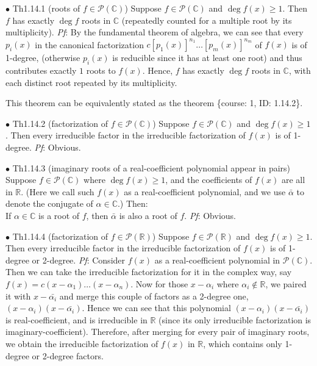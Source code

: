 \documentclass{article}
\begin{document}
\begin{Th}{$\bullet$ Th1.14.1 (roots of $f\in\mathcal{P}(\mathbb{C})$)}
    Suppose $f\in\mathcal{P}(\mathbb{C})$ and $\deg f(x)\geq 1$. Then $f$ has exactly $\deg f$ roots in $\mathbb{C}$ (repeatedly counted for a multiple root by its multiplicity).
    \tcblower
    \textit{Pf}: By the fundamental theorem of algebra, we can see that every $p_i(x)$ in the canonical factorization $c[p_1(x)]^{n_1}\dots[p_m(x)]^{n_m}$ of $f(x)$ is of 1-degree, (otherwise $p_i(x)$ is reducible since it has at least one root) and thus contributes exactly $1$ roots to $f(x)$. Hence, $f$ has exactly $\deg f$ roots in $\mathbb{C}$, with each distinct root repeated by its multiplicity. 
\end{Th}

\begin{Rmk}{}
    This theorem can be equivalently stated as the theorem \{course: 1, ID: 1.14.2\}.
\end{Rmk}

\begin{Th}{$\bullet$ Th1.14.2 (factorization of $f\in\mathcal{P}(\mathbb{C})$)}
    Suppose $f\in\mathcal{P}(\mathbb{C})$ and $\deg f(x)\geq 1$. Then every irreducible factor in the irreducible factorization of $f(x)$ is of 1-degree.
    \tcblower
    \textit{Pf}: Obvious.
\end{Th}

\begin{Th}{$\bullet$ Th1.14.3 (imaginary roots of a real-coefficient polynomial appear in pairs)}
    Suppose $f\in\mathcal{P}(\mathbb{C})$ where $\deg f(x)\geq 1$, and the coefficients of $f(x)$ are all in $\mathbb{R}$. \textcolor{Df}{(Here we call such $f(x)$ as a real-coefficient polynomial, and we use $\bar{\alpha}$ to denote the conjugate of $\alpha\in\mathbb{C}$.)} Then:\\
    If $\alpha\in\mathbb{C}$ is a root of $f$, then $\bar{\alpha}$ is also a root of $f$.
    \tcblower
    \textit{Pf}: Obvious.
\end{Th}

\begin{Th}{$\bullet$ Th1.14.4 (factorization of $f\in\mathcal{P}(\mathbb{R})$)}
    Suppose $f\in\mathcal{P}(\mathbb{R})$ and $\deg f(x)\geq 1$. Then every irreducible factor in the irreducible factorization of $f(x)$ is of 1-degree or 2-degree.
    \tcblower
    \textit{Pf}: Consider $f(x)$ as a real-coefficient polynomial in $\mathcal{P}(\mathbb{C})$. Then we can take the irreducible factorization for it in the complex way, say $f(x) = c(x-\alpha_1)\dots (x-\alpha_n)$. Now for those $x-\alpha_i$ where $\alpha_i\notin\mathbb{R}$, we paired it with $x-\bar{\alpha_i}$ and merge this couple of factors as a 2-degree one, $(x-\alpha_i)(x-\bar{\alpha_i})$. Hence we can see that this polynomial $(x-\alpha_i)(x-\bar{\alpha_i})$ is real-coefficient, and is irreducible in $\mathbb{R}$ (since its only irreducible factorization is imaginary-coefficient). Therefore, after merging for every pair of imaginary roots, we obtain the irreducible factorization of $f(x)$ in $\mathbb{R}$, which contains only 1-degree or 2-degree factors.
\end{Th}
\end{document}
